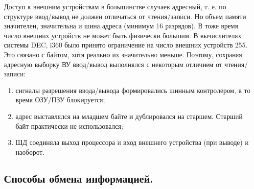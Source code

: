 \documentclass[unicode, 12pt, a4paper, oneside]{article}
\begin{document}
Доступ к внешним устройствам в большинстве случаев адресный, т. е. по структуре ввод/вывод не должен отличаться от чтения/записи. Но объем памяти значителен, значительна и шина адреса (минимум 16 разрядов). В тоже время число внешних устройств не может быть физически большим. В вычислителях системы DEC, i360 было принято ограничение на число внешних устройств 255. Это связано с байтом, хотя реально их значительно меньше. Поэтому, сохраняя адресную выборку ВУ ввод/вывод выполнялся с некоторым отличием  от чтения/записи:
\begin{enumerate}
\item сигналы разрешения ввода/вывода формировались шинным контролером, в то время ОЗУ/ПЗУ блокируется;
\item адрес выставлялся на младшем байте и дублировался на старшем. Старший байт практически не использовался;
\item ШД соединяла выход процессора и вход внешнего устройства (при выводе) и наоборот.
\end{enumerate}

\subsection*{Способы обмена информацией.}
\end{document}
